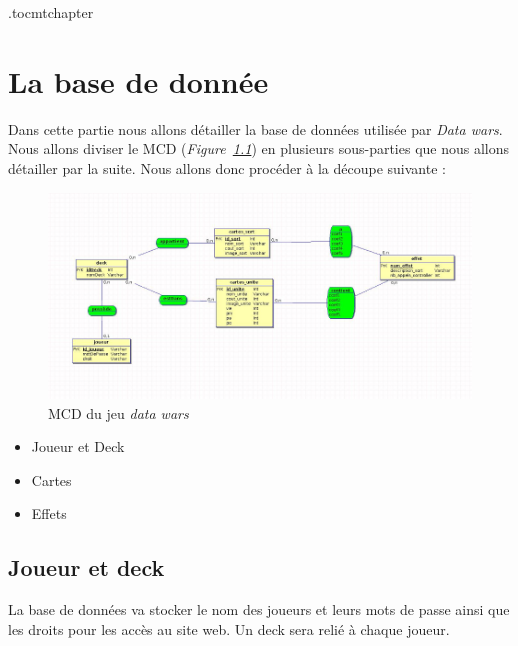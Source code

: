 \documentclass[a4paper, titlepage]{livret}
\begin{document}
\etocdepthtag.toc{mtchapter}
\tableofcontents
\chapter{La base de donnée}
    Dans cette partie nous allons détailler la base de données utilisée par \textit{Data wars}. Nous allons diviser le MCD (\textit{Figure~\ref{fig1}}) en plusieurs sous-parties que nous allons détailler par la suite. Nous allons donc procéder à la découpe suivante : 
    
    \begin{figure}[th]
      \begin{center}
        \includegraphics[scale=0.4]{Assets/MCD.png}
        \caption{MCD du jeu \textit{data wars}}
        \label{fig1}
      \end{center}
    \end{figure}
    
    \begin{itemize}
      \item Joueur et Deck
      \item Cartes
      \item Effets
    \end{itemize}

    \section{Joueur et deck}
      La base de données va stocker le nom des joueurs et leurs mots de passe ainsi que les droits pour les accès au site web. Un deck sera relié à chaque joueur.
    
\end{document}

